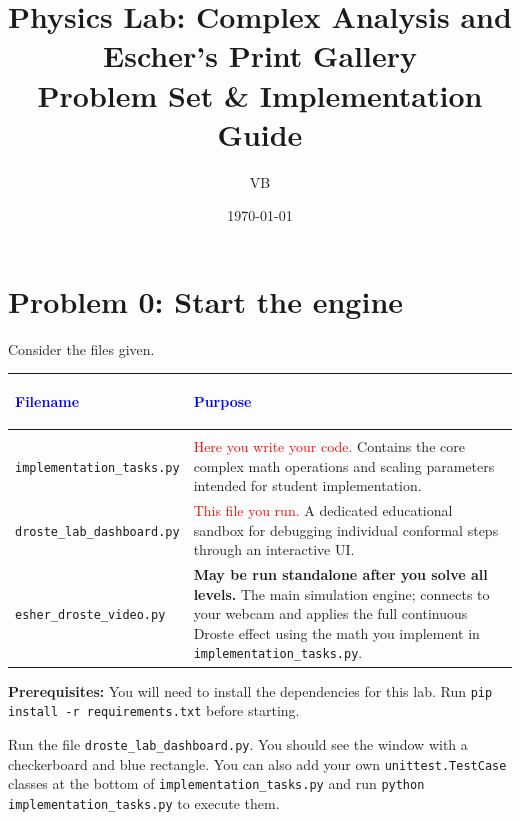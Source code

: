 \documentclass[11pt]{article}
\title{Physics Lab: Complex Analysis and Escher's Print Gallery \\ \large Problem Set \& Implementation Guide}
\author{VB}
\date{\today}
\begin{document}
\maketitle

\section*{Problem 0: Start the engine}

Consider the files given.
\begin{center}
\renewcommand{\arraystretch}{1.5}
\begin{tabularx}{\textwidth}{@{} >{\bfseries\raggedright\arraybackslash}p{5.5cm} X @{}}
\toprule
\textcolor{blue}{Filename} & \textcolor{blue}{Purpose} \\ \midrule
\multicolumn{2}{@{}l}{\textbf{Direct Interaction}} \\ \midrule
\lstinline|implementation_tasks.py| & \textcolor{red}{Here you write your code.} Contains the core complex math operations and scaling parameters intended for student implementation. \\
\lstinline|droste_lab_dashboard.py| & \textcolor{red}{This file you run.} A dedicated educational sandbox for debugging individual conformal steps through an interactive UI. \\
\lstinline|esher_droste_video.py| & \textbf{May be run standalone after you solve all levels.} The main simulation engine; connects to your webcam and applies the full continuous Droste effect using the math you implement in \lstinline|implementation_tasks.py|. \\ \midrule
\bottomrule
\end{tabularx}
\end{center}

\textbf{Prerequisites:} You will need to install the dependencies for this lab. Run \lstinline|pip install -r requirements.txt| before starting.


Run the file \lstinline|droste_lab_dashboard.py|. You should see the window with a checkerboard and blue rectangle. You can also add your own \lstinline|unittest.TestCase| classes at the bottom of \lstinline|implementation_tasks.py| and run \lstinline|python implementation_tasks.py| to execute them.
\end{document}
